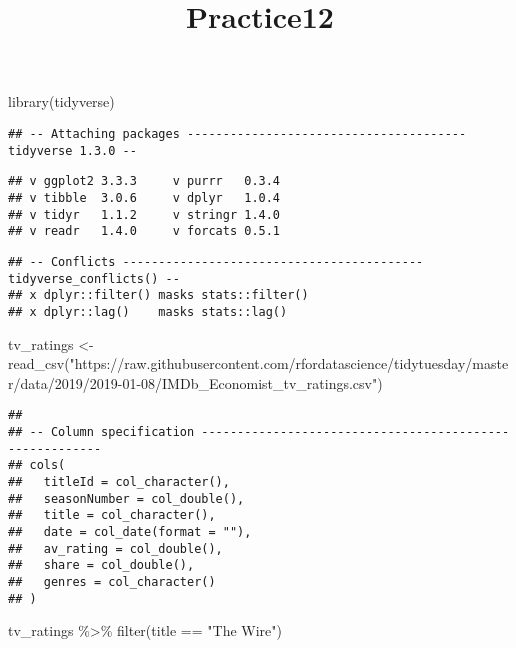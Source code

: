 \documentclass[
]{article}
\title{Practice12}
\author{}
\date{\vspace{-2.5em}}
\newenvironment{Shaded}{\begin{snugshade}}{\end{snugshade}}
\newcommand{\FunctionTok}[1]{\textcolor[rgb]{0.00,0.00,0.00}{#1}}
\newcommand{\NormalTok}[1]{#1}
\newcommand{\OtherTok}[1]{\textcolor[rgb]{0.56,0.35,0.01}{#1}}
\newcommand{\SpecialCharTok}[1]{\textcolor[rgb]{0.00,0.00,0.00}{#1}}
\newcommand{\StringTok}[1]{\textcolor[rgb]{0.31,0.60,0.02}{#1}}
\begin{document}
\maketitle

\begin{Shaded}
\begin{Highlighting}[]
\FunctionTok{library}\NormalTok{(tidyverse)}
\end{Highlighting}
\end{Shaded}

\begin{verbatim}
## -- Attaching packages --------------------------------------- tidyverse 1.3.0 --
\end{verbatim}

\begin{verbatim}
## v ggplot2 3.3.3     v purrr   0.3.4
## v tibble  3.0.6     v dplyr   1.0.4
## v tidyr   1.1.2     v stringr 1.4.0
## v readr   1.4.0     v forcats 0.5.1
\end{verbatim}

\begin{verbatim}
## -- Conflicts ------------------------------------------ tidyverse_conflicts() --
## x dplyr::filter() masks stats::filter()
## x dplyr::lag()    masks stats::lag()
\end{verbatim}

\begin{Shaded}
\begin{Highlighting}[]
\NormalTok{tv\_ratings }\OtherTok{\textless{}{-}} \FunctionTok{read\_csv}\NormalTok{(}\StringTok{"https://raw.githubusercontent.com/rfordatascience/tidytuesday/master/data/2019/2019{-}01{-}08/IMDb\_Economist\_tv\_ratings.csv"}\NormalTok{)}
\end{Highlighting}
\end{Shaded}

\begin{verbatim}
## 
## -- Column specification --------------------------------------------------------
## cols(
##   titleId = col_character(),
##   seasonNumber = col_double(),
##   title = col_character(),
##   date = col_date(format = ""),
##   av_rating = col_double(),
##   share = col_double(),
##   genres = col_character()
## )
\end{verbatim}

\begin{Shaded}
\begin{Highlighting}[]
\NormalTok{tv\_ratings }\SpecialCharTok{\%\textgreater{}\%}
  \FunctionTok{filter}\NormalTok{(title }\SpecialCharTok{==} \StringTok{"The Wire"}\NormalTok{)}
\end{Highlighting}
\end{Shaded}
\end{document}
